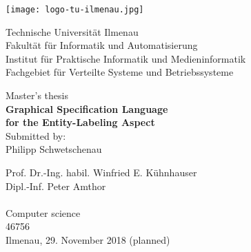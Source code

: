 \documentclass[twoside, openright, 12pt]{book}
\begin{document}
%
\begin{titlepage}
\newlength{\detailwidth}
\newlength{\detaildescriptionwidth}
\settowidth{\detailwidth}{Eingereicht:~~ Prof. Dr.-Ing. habil. Winfried E. Kühnhauser}
\settowidth{\detaildescriptionwidth}{Studies:~~} 
\begin{center}

\vfill {
	\texttt{[image: logo-tu-ilmenau.jpg]}
	\vspace{8ex}
}

\begin{normalsize}Technische Universität Ilmenau \\
Fakultät für Informatik und Automatisierung \\
Institut für Praktische Informatik und Medieninformatik \\
Fachgebiet für Verteilte Systeme und Betriebssysteme        
\end{normalsize}


\vfill {\large
	Master's thesis\\ \vspace{2ex}
	\LARGE \textbf{Graphical Specification Language \\for the Entity-Labeling Aspect} \\ \vspace{2.5ex} 
	\normalsize Submitted by: \\
	\Large Philipp Schwetschenau \\ \vspace{3ex} 
}
\vfill \parbox{\detailwidth}{
	 Prof. Dr.-Ing. habil. Winfried E. Kühnhauser \\
	 Dipl.-Inf. Peter Amthor \\
	\vspace{2ex} \\
	 Computer science\\  
	 46756  
	\vspace{2ex} \\
	 Ilmenau, 29. November 2018 (planned)
}
\vspace*{\fill}
\end{center}
\end{titlepage}

\mbox{}
\thispagestyle{empty}
\cleardoublepage

\setcounter{page}{1}
\tableofcontents
\end{document}
